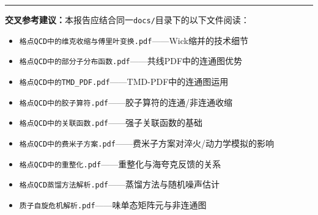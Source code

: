 \documentclass[12pt,a4paper]{ctexart}
\theoremstyle{definition}
\begin{document}
\vspace{0.5cm}
\noindent\rule{\textwidth}{0.5pt}
\small
\textbf{交叉参考建议：}本报告应结合同一\texttt{docs/}目录下的以下文件阅读：
\begin{itemize}[nosep]
    \item \texttt{格点QCD中的维克收缩与傅里叶变换.pdf}——Wick缩并的技术细节
    \item \texttt{格点QCD中的部分子分布函数.pdf}——共线PDF中的连通图优势
    \item \texttt{格点QCD中的TMD\_PDF.pdf}——TMD-PDF中的连通图运用
    \item \texttt{格点QCD中的胶子算符.pdf}——胶子算符的连通/非连通收缩
    \item \texttt{格点QCD中的关联函数.pdf}——强子关联函数的基础
    \item \texttt{格点QCD中的费米子方案.pdf}——费米子方案对淬火/动力学模拟的影响
    \item \texttt{格点QCD中的重整化.pdf}——重整化与海夸克反馈的关系
    \item \texttt{格点QCD蒸馏方法解析.pdf}——蒸馏方法与随机噪声估计
    \item \texttt{质子自旋危机解析.pdf}——味单态矩阵元与非连通图
\end{itemize}
\end{document}
